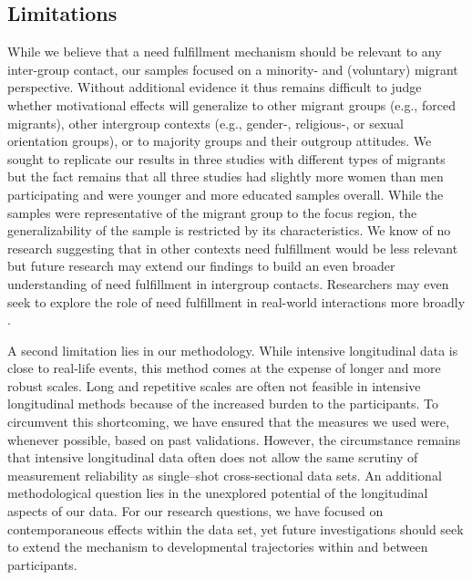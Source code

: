 \documentclass[man, 12pt, a4paper, mask]{apa7}
\theoremstyle{break}
\theoremstyle{plain}
\begin{document}
\subsection{Limitations}
While we believe that a need fulfillment mechanism should be relevant to any inter-group contact, our samples focused on a minority- and (voluntary) migrant perspective. Without additional evidence it thus remains difficult to judge whether motivational effects will generalize to other migrant groups (e.g., forced migrants), other intergroup contexts (e.g., gender-, religious-, or sexual orientation groups), or to majority groups and their outgroup attitudes. We sought to replicate our results in three studies with different types of migrants but the fact remains that all three studies had slightly more women than men participating and were younger and more educated samples overall. While the samples were representative of the migrant group to the focus region, the generalizability of the sample is restricted by its characteristics. We know of no research suggesting that in other contexts need fulfillment would be less relevant but future research may extend our findings to build an even broader understanding of need fulfillment in intergroup contacts. Researchers may even seek to explore the role of need fulfillment in real-world interactions more broadly \citep[also see][]{Downie2008}.

A second limitation lies in our methodology. While intensive longitudinal data is close to real-life events, this method comes at the expense of longer and more robust scales. Long and repetitive scales are often not feasible in intensive longitudinal methods because of the increased burden to the participants. To circumvent this shortcoming, we have ensured that the measures we used were, whenever possible, based on past validations. However, the circumstance remains that intensive longitudinal data often does not allow the same scrutiny of measurement reliability as single–shot cross-sectional data sets. An additional methodological question lies in the unexplored potential of the longitudinal aspects of our data. For our research questions, we have focused on contemporaneous effects within the data set, yet future investigations should seek to extend the mechanism to developmental trajectories within and between participants. 
\end{document}
